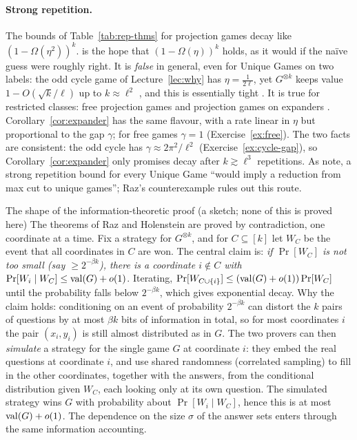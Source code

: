 \paragraph{Strong repetition.}  The bounds of Table~\ref{tab:rep-thms} for projection games decay like $(1-\Omega(\eta^2))^k$.   is the hope that $(1-\Omega(\eta))^k$ holds, as it would if the na\"ive guess were roughly right.
It is \emph{false} in general, even for Unique Games on two labels: the odd cycle game of Lecture~\ref{lec:why} has $\eta=\frac1{2\ell}$, yet $G^{\otimes k}$ keeps value $1-O(\sqrt k/\ell)$ up to $k\approx\ell^2$ \citep{Raz11}, and this is essentially tight \citep{FKO07}.
It is true for restricted classes: free projection games \citep{BRRRS09} and projection games on expanders \citep{RR12}.  Corollary~\ref{cor:expander} has the same flavour, with a rate linear in $\eta$ but proportional to the gap $\gamma$; for free games $\gamma=1$ (Exercise~\ref{ex:free}).
The two facts are consistent: the odd cycle has $\gamma\approx2\pi^2/\ell^2$ (Exercise~\ref{ex:cycle-gap}), so Corollary~\ref{cor:expander} only promises decay after $k\gtrsim\ell^3$ repetitions.
As \citet{DinurSteurer14} note, a strong repetition bound for every Unique Game ``would imply a reduction from max cut to unique games''; Raz's counterexample rules out this route.

\begin{bigpicture}{The shape of the information-theoretic proof (a sketch; none of this is proved here)}
The theorems of Raz and Holenstein are proved by contradiction, one coordinate at a time.  Fix a strategy for $G^{\otimes k}$, and for $C\subseteq[k]$ let $W_C$ be the event that all coordinates in $C$ are won.
The central claim is: \emph{if $\Pr[W_C]$ is not too small (say $\ge2^{-\beta k}$), there is a coordinate $i\notin C$ with $\Pr[W_i\mid W_C]\le\operatorname{val}(G)+o(1)$}.  Iterating, $\Pr[W_{C\cup\{i\}}]\le(\operatorname{val}(G)+o(1))\Pr[W_C]$ until the probability falls below $2^{-\beta k}$, which gives exponential decay.
Why the claim holds: conditioning on an event of probability $2^{-\beta k}$ can distort the $k$ pairs of questions by at most $\beta k$ bits of information in total, so for most coordinates $i$ the pair $(x_i,y_i)$ is still almost distributed as in $G$.
The two provers can then \emph{simulate} a strategy for the single game $G$ at coordinate $i$: they embed the real questions at coordinate $i$, and use shared randomness (correlated sampling) to fill in the other coordinates, together with the answers, from the conditional distribution given $W_C$, each looking only at its own question.
The simulated strategy wins $G$ with probability about $\Pr[W_i\mid W_C]$, hence this is at most $\operatorname{val}(G)+o(1)$.  The dependence on the size $\sigma$ of the answer sets enters through the same information accounting.
\end{bigpicture}

